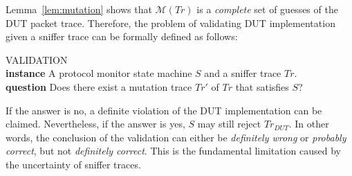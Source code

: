 Lemma~\ref{lem:mutation} shows that $\mathcal{M}(Tr)$ is a \textit{complete} set
of guesses of the DUT packet trace. Therefore, the problem of validating DUT
implementation given a sniffer trace can be formally defined as follows:

\begin{problem}
  \label{prob:validation}
  VALIDATION\\
  \textbf{instance} A protocol monitor state machine $S$ and a sniffer trace $Tr$.\\
  \textbf{question} Does there exist a mutation trace $Tr'$ of $Tr$ that satisfies $S$?
\end{problem}

If the answer is no, a definite violation of the DUT implementation can be
claimed. Nevertheless, if the answer is yes, $S$ may still reject $Tr_{DUT}$.
In other words, the conclusion of the validation can either be
\textit{definitely wrong} or \textit{probably correct}, but not
\textit{definitely correct}.  This is the fundamental limitation caused by the
uncertainty of sniffer traces.
